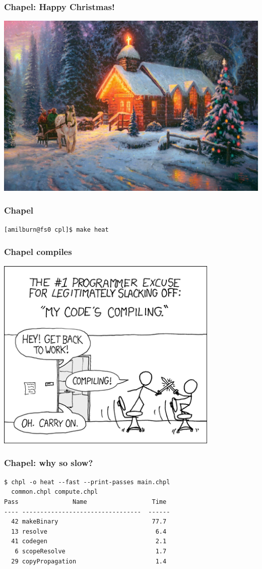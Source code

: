 \documentclass{beamer}
\begin{document}
\begin{frame}
 \frametitle{Chapel: Happy Christmas!}
 \includegraphics[width=\textwidth]{chrcha.jpg}
\end{frame}

\begin{frame}[fragile]
 \frametitle{Chapel}
\begin{verbatim}
[amilburn@fs0 cpl]$ make heat
\end{verbatim}
\end{frame}

\begin{frame}
 \frametitle{Chapel compiles}
 \includegraphics[width=0.8\textwidth]{xkcd.png}
\end{frame}

\begin{frame}[fragile]
 \frametitle{Chapel: why so slow?}
\begin{verbatim}
$ chpl -o heat --fast --print-passes main.chpl
  common.chpl compute.chpl
Pass               Name                  Time
---- ---------------------------------  ------
  42 makeBinary                          77.7
  13 resolve                              6.4
  41 codegen                              2.1
   6 scopeResolve                         1.7
  29 copyPropagation                      1.4
\end{verbatim}
\end{frame}
\end{document}
